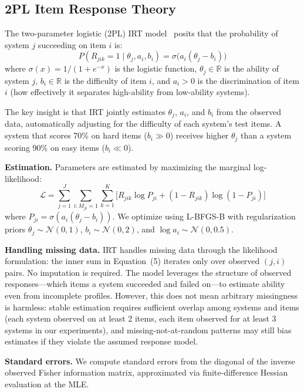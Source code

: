 \documentclass[11pt,a4paper]{article}
\begin{document}
\subsection{2PL Item Response Theory}

The two-parameter logistic (2PL) IRT model~\cite{lord1968,baker2004} posits that the probability of system $j$ succeeding on item $i$ is:
\begin{equation}
P(R_{jik} = 1 \mid \theta_j, a_i, b_i) = \sigma\big(a_i(\theta_j - b_i)\big)
\end{equation}
where $\sigma(x) = 1/(1 + e^{-x})$ is the logistic function, $\theta_j \in \mathbb{R}$ is the ability of system $j$, $b_i \in \mathbb{R}$ is the difficulty of item $i$, and $a_i > 0$ is the discrimination of item $i$ (how effectively it separates high-ability from low-ability systems).

The key insight is that IRT jointly estimates $\theta_j$, $a_i$, and $b_i$ from the observed data, automatically adjusting for the difficulty of each system's test items. A system that scores 70\% on hard items ($b_i \gg 0$) receives higher $\theta_j$ than a system scoring 90\% on easy items ($b_i \ll 0$).

\textbf{Estimation.} Parameters are estimated by maximizing the marginal log-likelihood:
\begin{equation}
\mathcal{L} = \sum_{j=1}^{J} \sum_{i: M_{ji}=1} \sum_{k=1}^{K} \big[R_{jik} \log P_{ji} + (1 - R_{jik}) \log(1 - P_{ji})\big]
\end{equation}
where $P_{ji} = \sigma(a_i(\theta_j - b_i))$. We optimize using L-BFGS-B with regularization priors $\theta_j \sim \mathcal{N}(0, 1)$, $b_i \sim \mathcal{N}(0, 2)$, and $\log a_i \sim \mathcal{N}(0, 0.5)$.

\textbf{Handling missing data.} IRT handles missing data through the likelihood formulation: the inner sum in Equation~(5) iterates only over observed $(j, i)$ pairs. No imputation is required. The model leverages the structure of observed responses---which items a system succeeded and failed on---to estimate ability even from incomplete profiles. However, this does not mean arbitrary missingness is harmless: stable estimation requires sufficient overlap among systems and items (each system observed on at least 2 items, each item observed for at least 3 systems in our experiments), and missing-not-at-random patterns may still bias estimates if they violate the assumed response model.

\textbf{Standard errors.} We compute standard errors from the diagonal of the inverse observed Fisher information matrix, approximated via finite-difference Hessian evaluation at the MLE.
\end{document}
